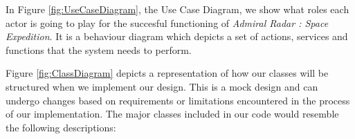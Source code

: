 
In Figure \ref{fig:UseCaseDiagram}, the Use Case Diagram, we show what roles each actor is going to play for the succesful functioning of \textit{Admiral Radar : Space Expedition}. It is a behaviour diagram which depicts a set of actions, services and functions that the system needs to perform.


Figure \ref{fig:ClassDiagram} depicts a representation of how our classes will be structured when we implement our design. This is a mock design and can undergo changes based on requirements or limitations encountered in the process of our implementation. The major classes included in our code would resemble the following descriptions: 

